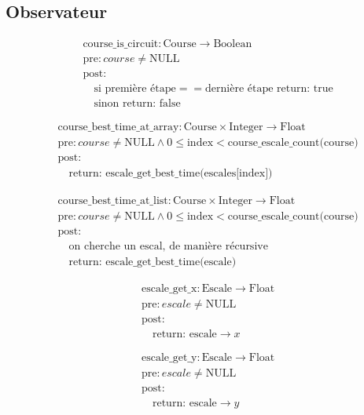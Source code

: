 \subsection{Observateur}



\[
\begin{aligned}
&\text{course\_is\_circuit}: \text{Course} \to \text{Boolean} \\
&\text{pre}: course \neq \text{NULL} \\
&\text{post}: \\
&\quad \text{si } \text{première étape} == \text{dernière étape return: true} \\
&\quad \text{sinon return: false}
\end{aligned}
\]



\[
\begin{aligned}
&\text{course\_best\_time\_at\_array}: \text{Course} \times \text{Integer} \to \text{Float} \\
&\text{pre}: course \neq \text{NULL} \land 0 \leq \text{index} < \text{course\_escale\_count(course)} \\
&\text{post}: \\
&\quad \text{return: escale\_get\_best\_time(escales[index])}
\end{aligned}
\]

\[
\begin{aligned}
&\text{course\_best\_time\_at\_list}: \text{Course} \times \text{Integer} \to \text{Float} \\
&\text{pre}: course \neq \text{NULL} \land 0 \leq \text{index} < \text{course\_escale\_count(course)} \\
&\text{post}: \\
&\quad \text{on cherche un escal, de manière récursive}\\
&\quad \text{return: escale\_get\_best\_time(escale)}
\end{aligned}
\]


\[
\begin{aligned}
&\text{escale\_get\_x}: \text{Escale} \to \text{Float} \\
&\text{pre}: escale \neq \text{NULL} \\
&\text{post}: \\
&\quad \text{return: escale} \rightarrow x
\end{aligned}
\]


\[
\begin{aligned}
&\text{escale\_get\_y}: \text{Escale} \to \text{Float} \\
&\text{pre}: escale \neq \text{NULL} \\
&\text{post}: \\
&\quad \text{return: escale}\rightarrow y
\end{aligned}
\]



